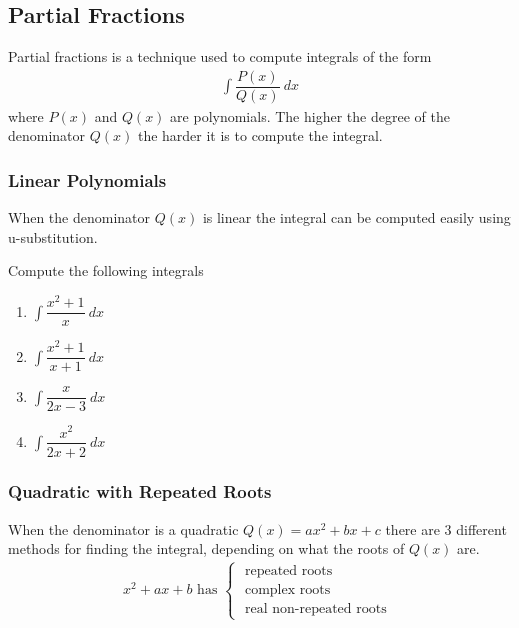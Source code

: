 \subsection{Partial Fractions}
Partial fractions is a technique used to compute integrals of the form
\begin{align*}
	\int \dfrac{P(x)}{Q(x)} \: dx
\end{align*}
where $P(x)$ and $Q(x)$ are polynomials.
The higher the degree of the denominator $Q(x)$ the harder it is to compute the integral.\\

\subsubsection*{Linear Polynomials}
When the denominator $Q(x)$ is linear the integral can be computed easily using u-substitution.
\begin{exercise}
	Compute the following integrals
	\begin{multicols}{2}
		\begin{enumerate}
			\item $ \int \dfrac{x^2+1}{x} \: dx$
			\item $ \int \dfrac{x^2 + 1}{x+1} \: dx$
			\item $ \int \dfrac{x}{2x-3} \: dx$
			\item $ \int \dfrac{x^2}{2x+2} \: dx$
		\end{enumerate}
	\end{multicols}
\end{exercise}

\subsubsection*{Quadratic with Repeated Roots}
When the denominator is a quadratic $Q(x) = ax^2 + bx + c$ there are 3 different methods for finding the integral, depending on what the roots of $Q(x)$ are.
\begin{align*}
	x^2 + ax + b \mbox{ has }
	\begin{cases}
		\mbox{ repeated roots } \\
		\mbox{ complex roots }  \\
		\mbox{ real non-repeated roots }
	\end{cases}
\end{align*}

